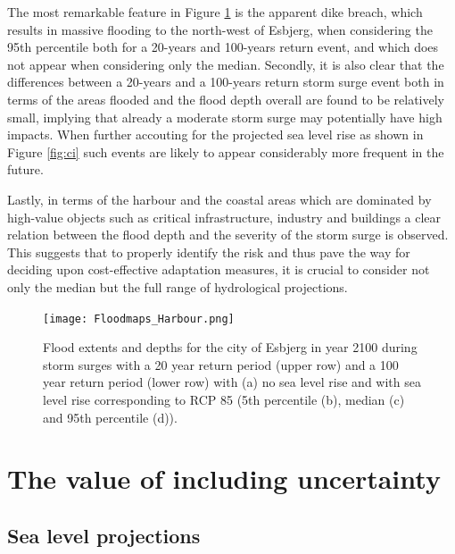 \documentclass[draft,linenumbers]{agujournal}
\begin{document}
The most remarkable feature in Figure \ref{fig:esbjerg} is the apparent dike breach, which results in massive flooding to the north-west of Esbjerg, when considering the 95th percentile both for a 20-years and 100-years return event, and which does not appear when considering only the median. Secondly, it is also clear that the differences between a 20-years and a 100-years return storm surge event both in terms of the areas flooded and the flood depth overall are found to be relatively small, implying that already a moderate storm surge may potentially have high impacts. When further accouting for the projected sea level rise as shown in Figure  \ref{fig:ci} such events are likely to appear considerably more frequent in the future.  

Lastly, in terms of the harbour and the coastal areas which are dominated by high-value objects such as critical infrastructure, industry and buildings a clear relation between the flood depth and the severity of the storm surge is observed. This suggests that to properly identify the risk and thus pave the way for deciding upon cost-effective adaptation measures, it is crucial to consider not only the median but the full range of hydrological projections.

\begin{figure}[!hbpt]
\begin{center}
\texttt{[image: Floodmaps\_Harbour.png]}
\caption{Flood extents and depths for the city of Esbjerg in year 2100 during storm surges with a 20 year return period (upper row) and a 100 year return period (lower row) with (a) no sea level rise and with sea level rise corresponding to RCP 85 (5th percentile (b), median (c) and 95th percentile (d)). }
\label{fig:esbjerg}
\end{center}
\end{figure}


\section{The value of including uncertainty}
\label{unc}

\subsection{Sea level projections}
\end{document}
